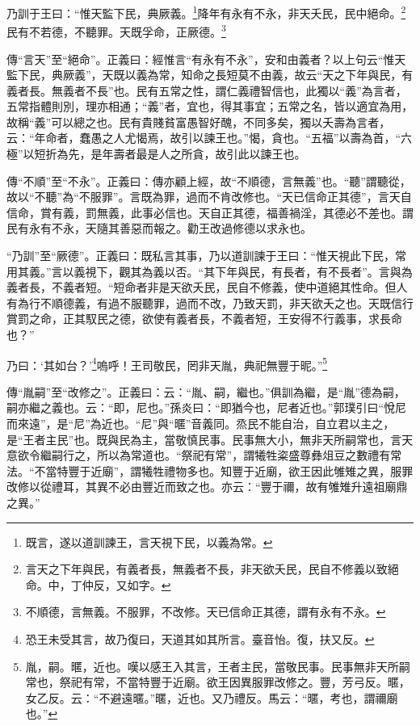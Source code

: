 乃訓于王曰：“惟天監下民，典厥義。\footnote{既言，遂以道訓諫王，言天視下民，以義為常。}降年有永有不永，非天夭民，民中絕命。\footnote{言天之下年與民，有義者長，無義者不長，非天欲夭民，民自不修義以致絕命。中，丁仲反，又如字。}民有不若德，不聽罪。天既孚命，正厥德。\footnote{不順德，言無義。不服罪，不改修。天已信命正其德，謂有永有不永。}


{\noindent\zhuan{}\fzbyks 傳“言天”至“絕命”。正義曰：經惟言“有永有不永”，安和由義者？以上句云“惟天監下民，典厥義”，天既以義為常，知命之長短莫不由義，故云“天之下年與民，有義者長。無義者不長”也。民有五常之性，謂仁義禮智信也，此獨以“義”為言者，五常指體則別，理亦相通；“義”者，宜也，得其事宜；五常之名，皆以適宜為用，故稱“義”可以總之也。民有貴賤貧富愚智好醜，不同多矣，獨以夭壽為言者，云：“年命者，蠢愚之人尤愒焉，故引以諫王也。”愒，貪也。“五福”以壽為首，“六極”以短折為先，是年壽者最是人之所貪，故引此以諫王也。 \par}

{\noindent\zhuan{}\fzbyks 傳“不順”至“不永”。正義曰：傳亦顧上經，故“不順德，言無義”也。“聽”謂聽從，故以“不聽”為“不服罪”。言既為罪，過而不肯改修也。“天已信命正其德”，言天自信命，賞有義，罰無義，此事必信也。天自正其德，福善禍淫，其德必不差也。謂民有永有不永，天隨其善惡而報之。勸王改過修德以求永也。 \par}

{\noindent\shu{}\fzkt “乃訓”至“厥德”。正義曰：既私言其事，乃以道訓諫于王曰：“惟天視此下民，常用其義。”言以義視下，觀其為義以否。“其下年與民，有長者，有不長者”。言與為義者長，不義者短。“短命者非是天欲夭民，民自不修義，使中道絕其性命。但人有為行不順德義，有過不服聽罪，過而不改，乃致天罰，非天欲夭之也。天既信行賞罰之命，正其馭民之德，欲使有義者長，不義者短，王安得不行義事，求長命也？” \par}

乃曰：‘其如台？’\footnote{恐王未受其言，故乃復曰，天道其如其所言。臺音怡。復，扶又反。}嗚呼！王司敬民，罔非天胤，典祀無豐于昵。”\footnote{胤，嗣。暱，近也。嘆以感王入其言，王者主民，當敬民事。民事無非天所嗣常也，祭祀有常，不當特豐于近廟。欲王因異服罪改修之。豐，芳弓反。暱，女乙反。云：“不避遠暱。”暱，近也。又乃禮反。馬云：“暱，考也，謂禰廟也。”}


{\noindent\zhuan{}\fzbyks 傳“胤嗣”至“改修之”。正義曰：云：“胤、嗣，繼也。”俱訓為繼，是“胤”德為嗣，嗣亦繼之義也。云：“即，尼也。”孫炎曰：“即猶今也，尼者近也。”郭璞引曰“悅尼而來遠”，是“尼”為近也。“尼”與“暱”音義同。烝民不能自治，自立君以主之，是“王者主民”也。既與民為主，當敬慎民事。民事無大小，無非天所嗣常也，言天意欲令繼嗣行之，所以為常道也。“祭祀有常”，謂犧牲粢盛尊彝俎豆之數禮有常法。“不當特豐于近廟”，謂犧牲禮物多也。知豐于近廟，欲王因此雊雉之異，服罪改修以從禮耳，其異不必由豐近而致之也。亦云：“豐于禰，故有雊雉升遠祖廟鼎之異。” \par}

